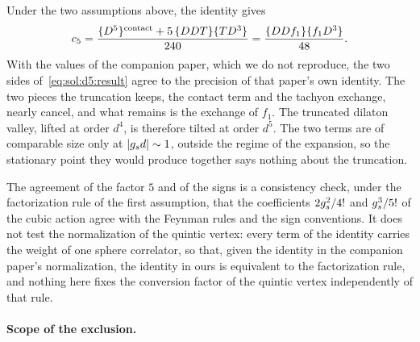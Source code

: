 Under the two assumptions above, the identity gives
\begin{equation}
  \label{eq:sol:d5:result}
  c_5
    = \frac{\{D^5\}^{\rm contact} + 5 \, \{D D T\} \{T D^3\}}{240}
    = \frac{\{D D f_1\} \{f_1 D^3\}}{48}.
\end{equation}
With the values of the companion paper, which we do not reproduce, the two sides of~\eqref{eq:sol:d5:result} agree to the precision of that paper's own identity.
The two pieces the truncation keeps, the contact term and the tachyon exchange, nearly cancel, and what remains is the exchange of $f_1$.
The truncated dilaton valley, lifted at order $d^4$, is therefore tilted at order $d^5$.
The two terms are of comparable size only at ${|g_s d|} \sim 1$, outside the regime of the expansion, so the stationary point they would produce together says nothing about the truncation.

The agreement of the factor $5$ and of the signs is a consistency check, under the factorization rule of the first assumption, that the coefficients $2 g_s^2 / 4!$ and $g_s^3 / 5!$ of the cubic action agree with the Feynman rules and the sign conventions.
It does not test the normalization of the quintic vertex: every term of the identity carries the weight of one sphere correlator, so that, given the identity in the companion paper's normalization, the identity in ours is equivalent to the factorization rule, and nothing here fixes the conversion factor of the quintic vertex independently of that rule.

\paragraph{Scope of the exclusion.}

